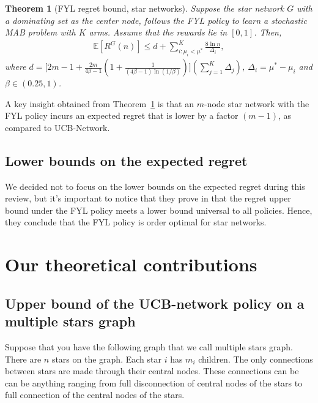 \documentclass{article}
\newtheorem{theorem}{Theorem}
\begin{document}
\begin{theorem}[FYL regret bound, star networks]
\label{Thm:5.1}
Suppose the star network $G$ with a dominating set as the center node, follows the FYL policy to learn a stochastic MAB problem with $K$ arms. Assume that the rewards lie in $[0,1]$. Then,
\begin{align*}
\mathbb{E}[R^G(n)] \leq d + \sum\limits_{i:\mu_i < \mu^*}^K \frac{8 \ln n}{\Delta_i},
\end{align*}
where $d = \Big[ 2m - 1 + \frac{2 m}{4 \beta -1} \left( 1 + \frac{1}{(4 \beta -1) \ln (1/ \beta)} \right) \Big] \left( \sum\limits_{j=1}^K \Delta_j \right)$, $\Delta_i= \mu^* - \mu_i$ and $\beta \in (0.25,1)$.
\end{theorem}

A key insight obtained from Theorem~\ref{Thm:5.1} is that an $m$-node star network with the FYL policy incurs an expected regret that is lower by a factor $(m - 1)$, as compared to UCB-Network.

\subsection{Lower bounds on the expected regret}

We decided not to focus on the lower bounds on the expected regret during this review, but it's important to notice that they prove in \cite{DBLP:journals/corr/KollaJG16} that the regret upper bound under the FYL policy meets a lower bound universal to all policies. Hence, they conclude that the FYL policy is order optimal for star networks.


\section{Our theoretical contributions}

\subsection{Upper bound of the UCB-network policy on a multiple stars graph}

Suppose that you have the following graph that we call multiple stars graph. There are $n$ stars on the graph. Each star $i$ has $m_i$ children. The only connections between stars are made through their central nodes. These connections can be can be anything ranging from full disconnection of central nodes of the stars to full connection of the central nodes of the stars. \\
\end{document}
